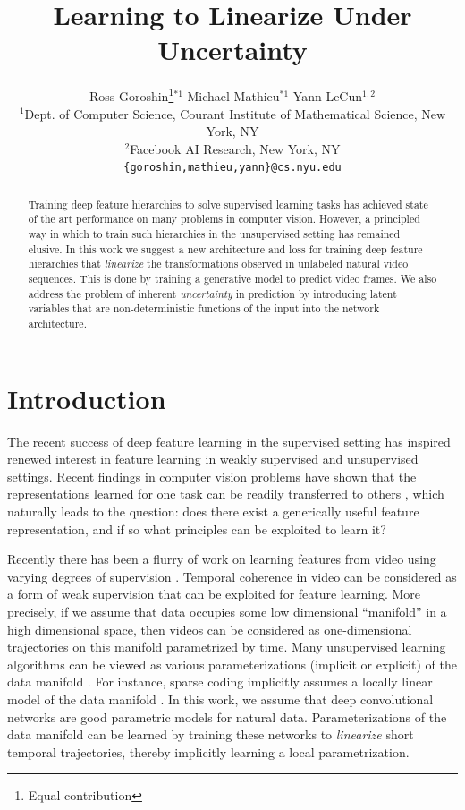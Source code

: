 \documentclass{article} %
\title{Learning to Linearize Under Uncertainty}
\author{
Ross Goroshin\thanks{Equal contribution}$^{*1}$ Michael Mathieu\footnotemark[1]$^{*1}$ Yann LeCun$^{1,2}$\\
{$^1$}Dept. of Computer Science,
Courant Institute of Mathematical Science,
New York, NY \\
{$^2$}Facebook AI Research,
New York, NY \\
\texttt{\{goroshin,mathieu,yann\}@cs.nyu.edu} \\
}
\begin{document}
\maketitle

\begin{abstract}
Training deep feature hierarchies to solve supervised learning tasks has achieved state of the art performance on many problems in computer vision. However, a principled way in which to train such hierarchies in the unsupervised setting has remained elusive. In this work we suggest a new architecture and loss for training deep feature hierarchies that \emph{linearize} the transformations observed in unlabeled natural video sequences. This is done by training a generative model to predict video frames. We also address the problem of inherent \emph{uncertainty} in prediction by introducing latent variables that are non-deterministic functions of the input into the network architecture. 
\end{abstract}

\section{Introduction}
The recent success of deep feature learning in the supervised setting has inspired renewed interest in feature learning in weakly supervised and unsupervised settings. Recent findings in computer vision problems have shown that the representations learned for one task can be readily transferred to others \cite{imageNetTransfer}, which naturally leads to the question: does there exist a generically useful feature representation, and if so what principles can be exploited to learn it? 

%
%

Recently there has been a flurry of work on learning features from video using varying degrees of supervision \cite{supFromTracker}\cite{FBvideo}\cite{predAlexNet}. Temporal coherence in video can be considered as a form of weak supervision that can be exploited for feature learning. More precisely, if we assume that data occupies some low dimensional ``manifold'' in a high dimensional space, then videos can be considered as one-dimensional trajectories on this manifold parametrized by time. Many unsupervised learning algorithms can be viewed as various parameterizations (implicit or explicit) of the data manifold \cite{Bengio2012}. For instance, sparse coding implicitly assumes a locally linear model of the data manifold \cite{sparseCoding}. In this work, we assume that deep convolutional networks are good parametric models for natural data. Parameterizations of the data manifold can be learned by training these networks to \emph{linearize} short temporal trajectories, thereby implicitly learning a local parametrization.   
\end{document}
